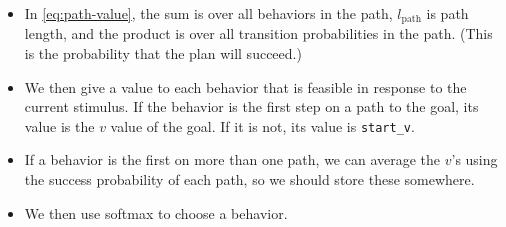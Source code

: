 \documentclass[11pt]{article}
\begin{document}
\begin{itemize}
\item In \cref{eq:path-value}, the sum is over all behaviors in the path,
\(l_\mathrm{path}\) is path length, and the product is over all
transition probabilities in the path. (This is the probability that
the plan will succeed.)

\item We then give a value to each behavior that is feasible in response
to the current stimulus. If the behavior is the first step on a path
to the goal, its value is the \(v\) value of the goal. If it is not,
its value is \texttt{start\_v}.

\item If a behavior is the first on more than one path, we can average the
\(v\)'s using the success probability of each path, so we should store
these somewhere.

\item We then use softmax to choose a behavior.
\end{itemize}
\end{document}
